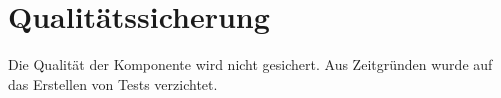 \section{Qualitätssicherung}\label{Qualitätssicherung}
Die Qualität der Komponente wird nicht gesichert. Aus Zeitgründen wurde auf das Erstellen von Tests verzichtet. 
